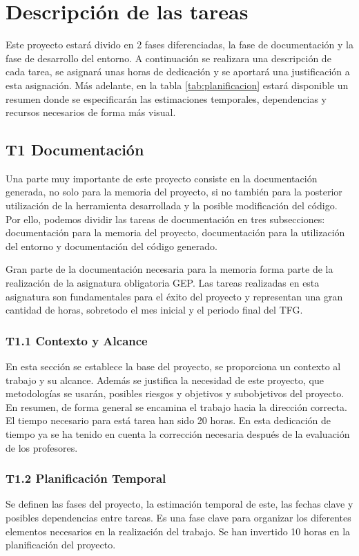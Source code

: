 \section{Descripción de las tareas}
Este proyecto estará divido en 2 fases diferenciadas, la fase de documentación y la fase de desarrollo del entorno. A continuación se realizara una descripción de cada tarea, se asignará unas horas de dedicación y se aportará una justificación a esta asignación. Más adelante, en la tabla \ref{tab:planificacion} estará disponible un resumen donde se especificarán las estimaciones temporales, dependencias y recursos necesarios de forma más visual.

\subsection{T1 Documentación}
Una parte muy importante de este proyecto consiste en la documentación generada, no solo para la memoria del proyecto, si no también para la posterior utilización de la herramienta desarrollada y la posible modificación del código. Por ello, podemos dividir las tareas de documentación en tres subsecciones: documentación para la memoria del proyecto, documentación para la utilización del entorno y documentación del código generado.

Gran parte de la documentación necesaria para la memoria forma parte de la realización de la asignatura obligatoria GEP. Las tareas realizadas en esta asignatura son fundamentales para el éxito del proyecto y representan una gran cantidad de horas, sobretodo el mes inicial y el periodo final del TFG.

\subsubsection*{T1.1 Contexto y Alcance}
En esta sección se establece la base del proyecto, se proporciona un contexto al trabajo y su alcance. Además se justifica la necesidad de este proyecto, que metodologías se usarán, posibles riesgos y objetivos y subobjetivos del proyecto. En resumen, de forma general se encamina el trabajo hacia la dirección correcta. El tiempo necesario para está tarea han sido 20 horas. En esta dedicación de tiempo ya se ha tenido en cuenta la corrección necesaria después de la evaluación de los profesores.

\subsubsection*{T1.2 Planificación Temporal}
Se definen las fases del proyecto, la estimación temporal de este, las fechas clave y posibles dependencias entre tareas. Es una fase clave para organizar los diferentes elementos necesarios en la realización del trabajo. Se han invertido 10 horas en la planificación del proyecto.

